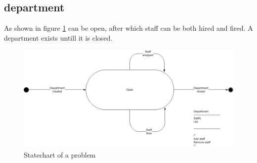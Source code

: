 \subsection{department}
As shown in figure \ref{fig:Klasse_diagram_department} can be open, after which staff can be both hired and fired. A department exists untill it is closed.
\begin{figure}[H]
\begin{center}
\includegraphics[width=1\textwidth]{input/problem_domain_analysis/Klasse_diagram_department.jpg}
\caption{Statechart of a problem}
\label{fig:Klasse_diagram_department}
\end{center}
\end{figure}